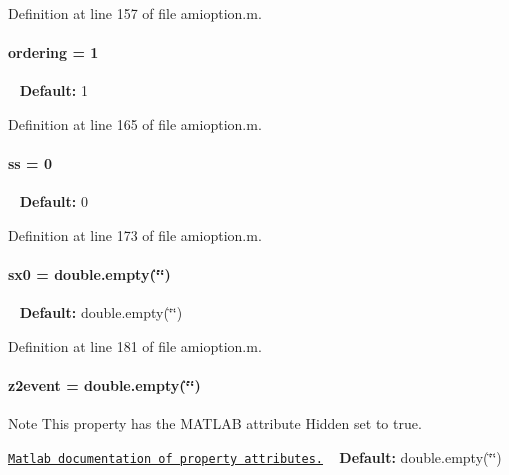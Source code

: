Definition at line 157 of file amioption.\+m.

\hypertarget{classamioption_aa5d555210685086c19e5d08afca6685b}{}
\paragraph[{ordering}]{\setlength{\rightskip}{0pt plus 5cm}ordering = 1}\label{classamioption_aa5d555210685086c19e5d08afca6685b}
~\newline
{\bfseries Default\+:} 1 

Definition at line 165 of file amioption.\+m.

\hypertarget{classamioption_a8f60c8102d29fcd525162d02eed4566b}{}
\paragraph[{ss}]{\setlength{\rightskip}{0pt plus 5cm}ss = 0}\label{classamioption_a8f60c8102d29fcd525162d02eed4566b}
~\newline
{\bfseries Default\+:} 0 

Definition at line 173 of file amioption.\+m.

\hypertarget{classamioption_ae40f9a7172d3a41725c151afaec347f7}{}
\paragraph[{sx0}]{\setlength{\rightskip}{0pt plus 5cm}sx0 = double.\+empty(\char`\"{}\char`\"{})}\label{classamioption_ae40f9a7172d3a41725c151afaec347f7}
~\newline
{\bfseries Default\+:} double.\+empty(\char`\"{}\char`\"{}) 

Definition at line 181 of file amioption.\+m.

\hypertarget{classamioption_a7a7be015feeb7a346dceccd49e622b4b}{}
\paragraph[{z2event}]{\setlength{\rightskip}{0pt plus 5cm}z2event = double.\+empty(\char`\"{}\char`\"{})}\label{classamioption_a7a7be015feeb7a346dceccd49e622b4b}
\begin{DoxyNote}{Note}
This property has the M\+A\+T\+L\+A\+B attribute {\ttfamily Hidden} set to true. 

\href{http://www.mathworks.com/help/matlab/matlab_oop/property-attributes.html}{\tt Matlab documentation of property attributes.} ~\newline
{\bfseries Default\+:} double.\+empty(\char`\"{}\char`\"{}) 
\end{DoxyNote}


